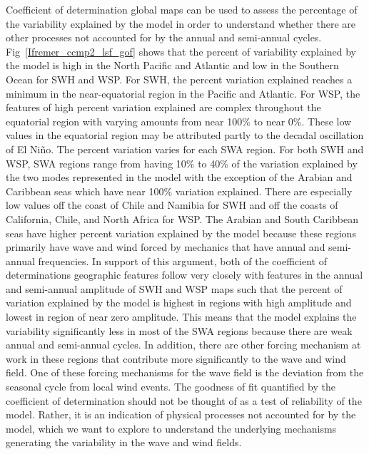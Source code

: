 \documentclass[12pt,twoside]{article}
\begin{document}
Coefficient of determination global maps can be used to assess the percentage of the variability explained by the model in order to understand whether there are other processes not accounted for by the annual and semi-annual cycles. Fig~\ref{Ifremer_ccmp2_lsf_gof} shows that the percent of variability explained by the model is high in the North Pacific and Atlantic and low in the Southern Ocean for SWH and WSP. For SWH, the percent variation explained reaches a minimum in the near-equatorial region in the Pacific and Atlantic. For WSP, the features of high percent variation explained are complex throughout the equatorial region with varying amounts from near 100\% to near 0\%. These low values in the equatorial region may be attributed partly to the decadal oscillation of El Ni\~no. The percent variation varies for each SWA region. For both SWH and WSP, SWA regions range from having 10\% to 40\% of the variation explained by the two modes represented in the model with the exception of the Arabian and Caribbean seas which have near 100\% variation explained. There are especially low values off the coast of Chile and Namibia for SWH and off the coasts of California, Chile, and North Africa for WSP. The Arabian and South Caribbean seas have higher percent variation explained by the model because these regions primarily have wave and wind forced by mechanics that have annual and semi-annual frequencies. In support of this argument, both of the coefficient of determinations geographic features follow very closely with features in the annual and semi-annual amplitude of SWH and WSP maps such that the percent of variation explained by the model is highest in regions with high amplitude and lowest in region of near zero amplitude. This means that the model explains the variability significantly less in most of the SWA regions because there are weak annual and semi-annual cycles. In addition, there are other forcing mechanism at work in these regions that contribute more significantly to the wave and wind field. One of these forcing mechanisms for the wave field is the deviation from the seasonal cycle from local wind events. The goodness of fit quantified by the coefficient of determination should not be thought of as a test of reliability of the model. Rather, it is an indication of physical processes not accounted for by the model, which we want to explore to understand the underlying mechanisms generating the variability in the wave and wind fields. 
\end{document}
